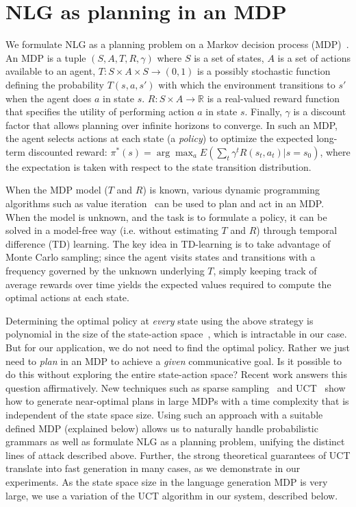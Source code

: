 \section{NLG as planning in an MDP}
We formulate NLG as a planning problem on a Markov decision process
(MDP)~\cite{puterman_1994_markov}. An MDP is a tuple $(S, A, T, R, \gamma)$ where $S$ is a
set of states, $A$ is a set of actions available to an agent,
$T:S\times A\times S \rightarrow (0,1)$ is a possibly stochastic
function defining the probability $T(s,a,s')$ with which the
environment transitions to $s'$ when the agent does $a$ in state $s$.
$R:S\times A \rightarrow \mathbb{R}$ is a real-valued reward function that
specifies the utility of performing action $a$ in state $s$. Finally,
$\gamma$ is a discount factor that allows planning over infinite
horizons to converge. In such an MDP, the agent selects actions at
each state (a {\em policy}) to optimize the expected long-term
discounted reward: $\pi^*(s)=\arg \max_a E(\sum_t \gamma^t
R(s_t,a_t)|s=s_0)$, where the expectation is taken with respect to the
state transition distribution.

When the MDP model ($T$ and $R$) is
known, various dynamic programming algorithms such as value
iteration~\cite{bellman_1957_dynamic} can be used to plan and act in an MDP. When the
model is unknown, and the task is to formulate a policy, it can be
solved in a model-free way (i.e. without estimating $T$ and $R$)
through temporal difference (TD) learning. The key idea in TD-learning
is to take advantage of Monte Carlo sampling; since the agent visits
states and transitions with a frequency governed by the unknown
underlying $T$, simply keeping track of average rewards over time
yields the expected values required to compute the optimal actions at
each state.

Determining the optimal policy at {\em every} state using the above
strategy is polynomial in the size of the state-action
space~\cite{brafman_2003_rmax}, which is intractable in our case. But for our application, we do not
need to find the optimal policy. Rather we just need to {\em plan} in
an MDP to achieve a {\em given} communicative goal. Is it
possible to do this without exploring the entire state-action space?
Recent work answers this question affirmatively. New techniques such
as sparse sampling~\cite{kearns_1999_sparse} and
UCT~\cite{kocsis_bandit_2006} show how to generate near-optimal plans
in large MDPs with a time complexity that is independent of the state
space size. Using such an approach with a suitable defined MDP
(explained below) allows us to naturally handle
probabilistic grammars as well as formulate NLG as a planning problem,
unifying the distinct lines of attack described above. Further, the
strong theoretical guarantees of UCT translate into fast generation in
many cases, as we demonstrate in our experiments.
As the state space size in the language generation MDP is
very large, we use a variation of the UCT algorithm in our system,
described below.

